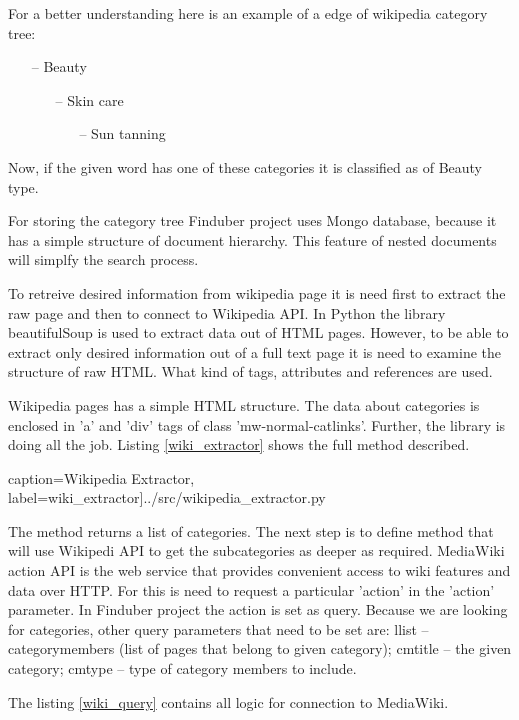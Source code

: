 For a better understanding here is an example of a edge of wikipedia category tree:

\begin{enumerate}
\item[--] Beauty
\begin{enumerate}
\item[--] Skin care
\begin{enumerate}
\item[--] Sun tanning
\end{enumerate}
\end{enumerate}
\end{enumerate}

Now, if the given word has one of these categories it is classified as of Beauty type. 

For storing the category tree Finduber project uses Mongo database, because it has a simple structure of document hierarchy. This feature of nested documents will simplfy the search process. 

To retreive desired information from wikipedia page it is need first to extract the raw page and then to connect to Wikipedia API. In Python the library beautifulSoup is used to extract data out of HTML pages. However, to be able to extract only desired information out of a full text page it is need to examine the structure of raw HTML. What kind of tags, attributes and references are used.

Wikipedia pages has a simple HTML structure. The data about categories is enclosed in 'a' and 'div' tags of class 'mw-normal-catlinks'. Further, the library is doing all the job. Listing \ref{wiki_extractor} shows the full method described.

 caption={Wikipedia Extractor}, label=wiki_extractor]{../src/wikipedia_extractor.py}

The method returns a list of categories. The next step is to define method that will use Wikipedi API to get the subcategories as deeper as required. MediaWiki action API is the web service that provides convenient access to wiki features and data over HTTP. For this is need to request a particular 'action' in the 'action' parameter. In Finduber project the action is set as query. Because we are looking for categories, other query parameters that need to be set are: llist -- categorymembers (list of pages that belong to given category); cmtitle -- the given category; cmtype -- type of category members to include.

The listing \ref{wiki_query} contains all logic for connection to MediaWiki. 

